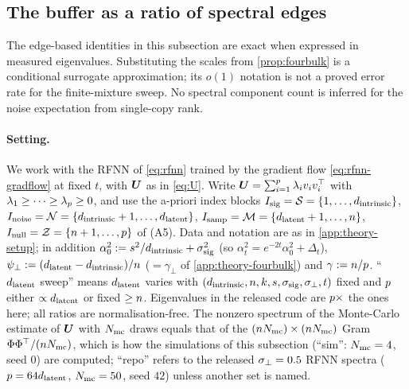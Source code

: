 \subsection{The buffer as a ratio of spectral edges}
\noindent The edge-based identities in this subsection are exact when expressed in measured eigenvalues. Substituting the scales from \cref{prop:fourbulk} is a conditional surrogate approximation; its $o(1)$ notation is not a proved error rate for the finite-mixture sweep. No spectral component count is inferred for the noise expectation from single-copy rank.
\label{app:theory-buffer}

\paragraph{Setting.}
We work with the RFNN of \eqref{eq:rfnn} trained by the gradient flow \eqref{eq:rfnn-gradflow} at fixed $t$, with $\bm{U}$ as in \eqref{eq:U}. Write $\bm{U}=\sum_{i=1}^{p}\lambda_iv_iv_i^\top$ with $\lambda_1\ge\dots\ge\lambda_{p}\ge0$, and use the a-priori index blocks $I_{\rm sig}=\mathcal S=\{1,\dots,d_{\mathrm{intrinsic}}\}$, $I_{\rm noise}=\mathcal N=\{d_{\mathrm{intrinsic}}+1,\dots,d_{\mathrm{latent}}\}$, $I_{\rm samp}=\mathcal M=\{d_{\mathrm{latent}}+1,\dots,n\}$, $I_{\rm null}=\mathcal Z=\{n+1,\dots,p\}$ of (A5). Data and notation are as in \cref{app:theory-setup}; in addition $\alpha_0^2:=s^2/d_{\mathrm{intrinsic}}+\sigma_{\mathrm{sig}}^2$ (so $\alpha_t^2=e^{-2t}\alpha_0^2+\Delta_t$), $\psi_\perp:=(d_{\mathrm{latent}}-d_{\mathrm{intrinsic}})/n$ ($=\gamma_\perp$ of \cref{app:theory-fourbulk}) and $\gamma:=n/p$. ``$d_{\mathrm{latent}}$ sweep'' means $d_{\mathrm{latent}}$ varies with $(d_{\mathrm{intrinsic}},n,k,s,\sigma_{\mathrm{sig}},\sigma_{\perp},t)$ fixed and $p$ either $\propto d_{\mathrm{latent}}$ or fixed $\ge n$. Eigenvalues in the released code are $p\times$ the ones here; all ratios are normalisation-free. The nonzero spectrum of the Monte-Carlo estimate of $\bm{U}$ with $N_{\rm mc}$ draws equals that of the $(n N_{\rm mc})\times(n N_{\rm mc})$ Gram $\Phi\Phi^\top/(n N_{\rm mc})$, which is how the simulations of this subsection (``sim'': $N_{\rm mc}=4$, seed $0$) are computed; ``repo'' refers to the released $\sigma_{\perp}=0.5$ RFNN spectra ($p=64d_{\mathrm{latent}}$, $N_{\rm mc}=50$, seed $42$) unless another set is named.

